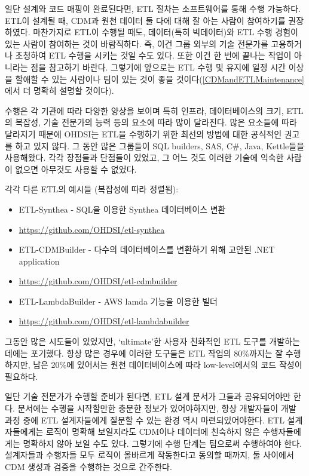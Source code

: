 \documentclass[11pt]{book}
\providecommand{\tightlist}{%
  \setlength{\itemsep}{0pt}\setlength{\parskip}{0pt}}
\theoremstyle{definition}
\theoremstyle{definition}
\theoremstyle{definition}
\theoremstyle{remark}
\begin{document}
일단 설계와 코드 매핑이 완료된다면, ETL 절차는 소프트웨어를 통해 수행
가능하다. ETL이 설계될 때, CDM과 원천 데이터 둘 다에 대해 잘 아는 사람이
참여하기를 권장하였다. 마찬가지로 ETL이 수행될 때도, 데이터(특히
빅데이터)와 ETL 수행 경험이 있는 사람이 참여하는 것이 바람직하다. 즉,
이건 그룹 외부의 기술 전문가를 고용하거나 초청하여 ETL 수행을 시키는
것일 수도 있다. 또한 이건 한 번에 끝나는 작업이 아니라는 점을 참고하기
바란다. 그렇기에 앞으로는 ETL 수행 및 유지에 일정 시간 이상을 할애할 수
있는 사람이나 팀이 있는 것이 좋을 것이다(\ref{CDMandETLMaintenance}에서
더 명확히 설명할 것이다).

수행은 각 기관에 따라 다양한 양상을 보이며 특히 인프라, 데이터베이스의
크기, ETL의 복잡성, 기술 전문가의 능력 등의 요소에 따라 많이 달라진다.
많은 요소들에 따라 달라지기 때문에 OHDSI는 ETL을 수행하기 위한 최선의
방법에 대한 공식적인 권고를 하고 있지 않다. 그 동안 많은 그룹들이 SQL
builders, SAS, C\#, Java, Kettle들을 사용해왔다. 각각 장점들과 단점들이
있었고, 그 어느 것도 이러한 기술에 익숙한 사람이 없으면 아무것도 사용할
수 없었다.

각각 다른 ETL의 예시들 (복잡성에 따라 정렬됨):

\begin{itemize}
\tightlist
\item
  ETL-Synthea - SQL을 이용한 Synthea 데이터베이스 변환
\item
  \url{https://github.com/OHDSI/etl-synthea}
\item
  ETL-CDMBuilder - 다수의 데이터베이스를 변환하기 위해 고안된 .NET
  application
\item
  \url{https://github.com/OHDSI/etl-cdmbuilder}
\item
  ETL-LambdaBuilder - AWS lamda 기능을 이용한 빌더
\item
  \url{https://github.com/OHDSI/etl-lambdabuilder}
\end{itemize}

그동안 많은 시도들이 있었지만, `ultimate'한 사용자 친화적인 ETL 도구를
개발하는데에는 포기했다. 항상 많은 경우에 이러한 도구들은 ETL 작업의
80\%까지는 잘 수행하지만, 남은 20\%에 있어서는 원천 데이터베이스에 따라
low-level에서의 코드 작성이 필요하다.

일단 기술 전문가가 수행할 준비가 된다면, ETL 설계 문서가 그들과
공유되어야만 한다. 문서에는 수행을 시작할만한 충분한 정보가
있어야하지만, 항상 개발자들이 개발 과정 중에 ETL 설계자들에게 질문할 수
있는 환경 역시 마련되있어야한다. ETL 설계자들에게는 로직이 명확해
보일지라도 CDM이나 데이터에 친숙하지 않은 수행자들에게는 명확하지 않아
보일 수도 있다. 그렇기에 수행 단계는 팀으로써 수행하여야 한다.
설계자들과 수행자들 모두 로직이 올바르게 작동한다고 동의할 때까지, 둘
사이에서 CDM 생성과 검증을 수행하는 것으로 간주한다.
\end{document}
